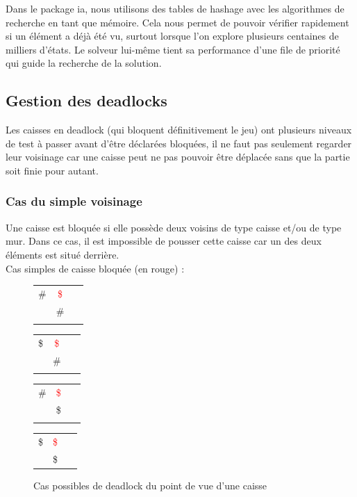 \documentclass[a4paper,12pt]{article} %
\begin{document}
Dans le package ia, nous utilisons des tables de hashage avec les algorithmes de recherche en tant que mémoire. Cela nous permet de pouvoir vérifier rapidement si un élément a déjà été vu, surtout lorsque l'on explore plusieurs centaines de milliers d'états.
Le solveur lui-même tient sa performance d'une file de priorité qui guide la recherche de la solution.

\subsection{Gestion des deadlocks}

Les caisses en deadlock (qui bloquent définitivement le jeu) ont plusieurs niveaux de test à passer avant d'être déclarées bloquées, il ne faut pas seulement regarder leur voisinage car une caisse peut ne pas pouvoir être déplacée sans que la partie soit finie pour autant.

\subsubsection{Cas du simple voisinage}

Une caisse est bloquée si elle possède deux voisins de type caisse et/ou de type mur. Dans ce cas, il est impossible de pousser cette caisse car un des deux éléments est situé derrière.\\

Cas simples de caisse bloquée (en rouge) : 

\begin{figure}[!h]
\centering
\begin{tabular}{ l c r }
\# & \textcolor{red}{\$} & \ \\
\  &      \#             & \ \\
\\
\hline
\end{tabular}

\begin{tabular}{ l c r }\\
\$ & \textcolor{red}{\$} & \ \\
\  &      \#             & \ \\
\\
\hline
\end{tabular}

\begin{tabular}{ l c r }\\
\# & \textcolor{red}{\$} & \ \\
\  &      \$             & \ \\
\\
\hline
\end{tabular}

\begin{tabular}{ l c r }\\
\$  &   \textcolor{red}{\$}  & \ \\
\   &        \$              & \ \\
\end{tabular}

\caption{Cas possibles de deadlock du point de vue d'une caisse}
\end{figure}
\end{document}
